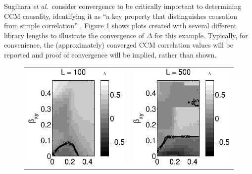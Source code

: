 \documentclass[a4paper,11pt]{article}
\begin{document}
Sugihara {\em et al.\ }consider convergence to be critically important to determining CCM causality, identifying it as ``a key property that distinguishes causation from simple correlation'' \cite{Sugihara2012}.  Figure \ref{fig:} shows plots created with several different library lengths to illustrate the convergence of $\Delta$ for this example.  Typically, for convenience, the (approximately) converged CCM correlation values will be reported and proof of convergence will be implied, rather than shown.
\begin{figure}[ht]
\label{fig:}
\begin{tabular}{cc}
\includegraphics[scale=0.9]{Figure1A.eps} & \includegraphics[scale=0.9]{Figure1B.eps}\\

\end{tabular}
\end{figure}
\end{document}
